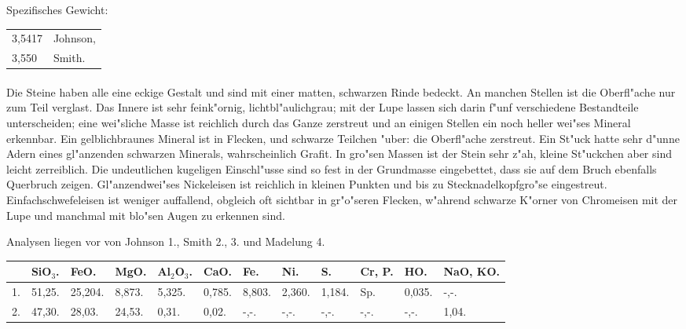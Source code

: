 \documentclass[a4paper, 11pt, oneside]{article}
\begin{document}
Spezifisches Gewicht:  
\begin{table}[!ht]
    \centering
    \begin{tabular}{l l}
        3,5417 & Johnson,\\
        3,550 & Smith.
    \end{tabular}
\end{table}
\paragraph{}
Die Steine haben alle eine eckige Gestalt und sind mit einer matten, schwarzen Rinde bedeckt. An manchen Stellen ist die Oberfl"ache nur zum Teil verglast. Das Innere ist sehr feink"ornig, lichtbl"aulichgrau; mit der Lupe lassen sich darin f"unf verschiedene Bestandteile unterscheiden; eine wei"sliche Masse ist reichlich durch das Ganze zerstreut und an einigen Stellen ein noch heller wei"ses Mineral erkennbar. Ein gelblichbraunes Mineral ist in Flecken, und schwarze Teilchen "uber: die Oberfl"ache zerstreut. Ein St"uck hatte sehr d"unne Adern eines gl"anzenden schwarzen Minerals, wahrscheinlich Grafit. In gro"sen Massen ist der Stein sehr z"ah, kleine St"uckchen aber sind leicht zerreiblich. Die undeutlichen kugeligen Einschl"usse sind so fest in der Grundmasse eingebettet, dass sie auf dem Bruch ebenfalls Querbruch zeigen. Gl"anzendwei"ses Nickeleisen ist reichlich in kleinen Punkten und bis zu Stecknadelkopfgro"se eingestreut. Einfachschwefeleisen ist weniger auffallend, obgleich oft sichtbar in gr"o"seren Flecken, w"ahrend schwarze K"orner von Chromeisen mit der Lupe und manchmal mit blo"sen Augen zu erkennen sind.

Analysen liegen vor von Johnson 1., Smith 2., 3. und Madelung 4.
\begin{table}[H]
    \centering
    \footnotesize
    \begin{tabular}{p{3mm} p{5mm} p{6mm} p{6mm} p{6mm} p{5mm} p{5mm} p{5mm} p{5mm} p{10mm} p{5mm} p{15mm}}
         & SiO$_{3}$. & FeO. & MgO. & Al$_{2}$O$_{3}$. & CaO. & Fe. & Ni. & S. & Cr, P. & HO. & NaO, KO. \\ \hline
        1. & 51,25. & 25,204. & 8,873. & 5,325. & 0,785. & 8,803. & 2,360. & 1,184. & Sp. & 0,035. & -,-. \\
        2. & 47,30. & 28,03. & 24,53. & 0,31. & 0,02. & -,-. & -,-. & -,-. & -,-. & -,-. & 1,04. \\
    \end{tabular}
\end{table}
\end{document}
